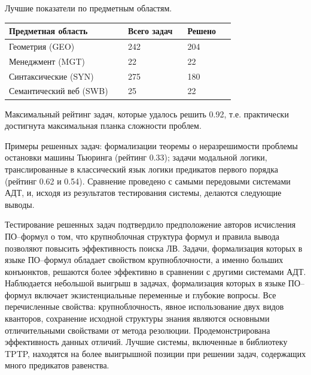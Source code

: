 \documentclass[a4paper]{report}
\begin{document}
Лучшие показатели по предметным областям.

{\small{}
\begin{longtable}[H]{|p{0.4\linewidth}|p{0.2\linewidth}|p{0.15\linewidth}|}
\hline
\textbf{Предметная область} & \textbf{Всего задач} & \textbf{Решено} \\
\hline
Геометрия (GEO) & 242 & 204 \\
\hline
Менеджмент (MGT) & 22 & 22 \\
\hline
Синтаксические (SYN) & 275 & 180 \\
\hline
Семантический веб (SWB) & 25 & 22 \\
\hline
\end{longtable}
}



Максимальный рейтинг задач, которые удалось решить 0.92, т.е. практически достигнута максимальная планка сложности проблем.

Примеры решенных задач: формализации теоремы о неразрешимости проблемы остановки машины Тьюринга (рейтинг 0.33); задачи модальной логики, транслированные в классический язык логики предикатов первого порядка (рейтинг 0.62 и 0.54). Сравнение проведено с самыми передовыми системами АДТ, и, исходя из результатов тестирования системы, делаются следующие выводы.

Тестирование решенных задач подтвердило предположение авторов исчисления ПО--формул о том, что крупноблочная структура формул и правила вывода позволяют повысить эффективность поиска ЛВ. Задачи, формализация которых в языке ПО--формул обладает свойством крупноблочности, а именно больших конъюнктов, решаются более эффективно в сравнении с другими системами АДТ. Наблюдается небольшой выигрыш в задачах, формализация которых в языке ПО--формул включает экзистенциальные переменные и глубокие вопросы. Все перечисленные свойства: крупноблочность, явное использование двух видов кванторов, сохранение исходной структуры знания являются основными отличительными свойствами от метода резолюции. Продемонстрирована эффективность данных отличий. Лучшие системы, включенные в библиотеку TPTP, находятся на более выигрышной позиции при решении задач, содержащих много предикатов равенства.
\end{document}
